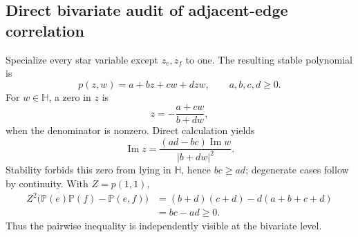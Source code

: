 \documentclass[11pt]{article}
\numberwithin{equation}{section}
\newcommand{\bbP}{\mathbb P}
\newcommand{\Hh}{\mathbb H}
\begin{document}
\subsection{Direct bivariate audit of adjacent-edge correlation}\label{app:bivariate}

Specialize every star variable except $z_e,z_f$ to one.  The resulting stable polynomial is
\[
 p(z,w)=a+bz+cw+dzw,
 \qquad a,b,c,d\geq0.
\]
For $w\in\Hh$, a zero in $z$ is
\[
 z=-\frac{a+cw}{b+dw},
\]
when the denominator is nonzero.  Direct calculation yields
\begin{equation}\label{eq:mobius-imaginary}
 \operatorname{Im}z
 =\frac{(ad-bc)\operatorname{Im}w}{|b+dw|^2}.
\end{equation}
Stability forbids this zero from lying in $\Hh$, hence $bc\geq ad$; degenerate cases follow by continuity.  With $Z=p(1,1)$,
\begin{align*}
 Z^2\bigl(\bbP(e)\bbP(f)-\bbP(e,f)\bigr)
 &=(b+d)(c+d)-d(a+b+c+d)\\
 &=bc-ad\geq0.
\end{align*}
Thus the pairwise inequality is independently visible at the bivariate level.
\end{document}

